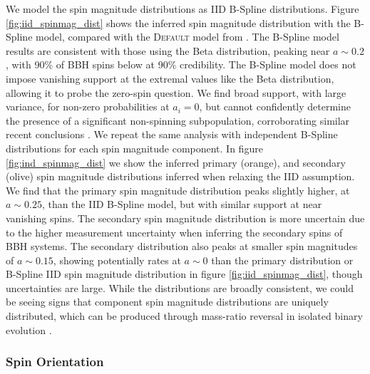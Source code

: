 We model the spin magnitude distributions as IID B-Spline distributions. 
Figure \ref{fig:iid_spinmag_dist} shows the inferred spin magnitude distribution with the B-Spline model, compared with the \textsc{Default} model from \citet{o3b_astro_dist}. 
The B-Spline model results are consistent with those using the Beta distribution, peaking near $a\sim0.2$, with 90\% of BBH spins below 
\result{$\CIPlusMinus{\macros[BSplineIIDCompSpins][a_90percentile]}$} at 90\% credibility. The B-Spline model does not impose vanishing support at the extremal values like the Beta distribution, 
allowing it to probe the zero-spin question. We find broad support, with large variance, for non-zero probabilities at $a_i=0$, but cannot confidently determine the presence of 
a significant non-spinning subpopulation, corroborating similar recent conclusions \citep{BuildBetterSpinModels,Callister_NoEvidence,GWTC3MonashSpin,Mould2022}. 
We repeat the same analysis with independent B-Spline distributions for each spin magnitude component. In figure \ref{fig:ind_spinmag_dist} 
we show the inferred primary (orange), and secondary (olive) spin magnitude distributions inferred when relaxing the IID assumption. We find that the primary spin magnitude distribution 
peaks slightly higher, at $a\sim0.25$, than the IID B-Spline model, but with similar support at near vanishing spins. The secondary spin magnitude distribution is more uncertain due to the 
higher measurement uncertainty when inferring the secondary spins of BBH systems. The secondary distribution also peaks at smaller spin magnitudes of $a\sim0.15$, showing potentially rates at $a\sim0$ than the primary distribution or B-Spline IID spin magnitude distribution in figure \ref{fig:iid_spinmag_dist}, though uncertainties are large. While the distributions are broadly consistent, we could be seeing signs that component spin magnitude distributions are uniquely distributed, which can be produced through mass-ratio reversal in isolated binary evolution \citep{Mould2022}.

\subsubsection{Spin Orientation}

